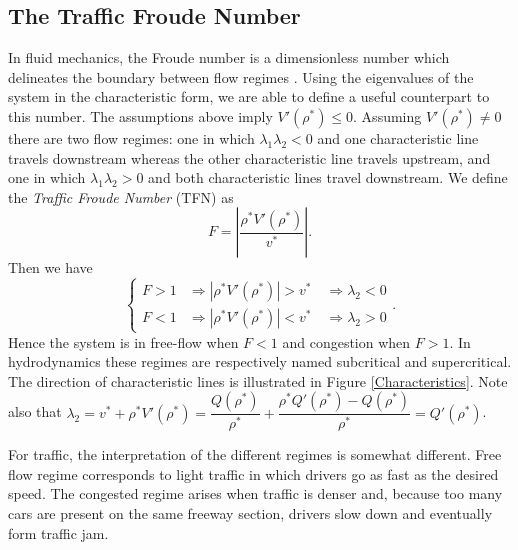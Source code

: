 \documentclass[a4paper, 10pt, conference]{ieeeconf}      %
\begin{document}
\subsection{The Traffic Froude Number}
In fluid mechanics, the Froude number is a dimensionless number which delineates the boundary between flow regimes \cite{litrico2009modeling, Sturm}. Using the eigenvalues of the system in the characteristic form, we are able to define a useful counterpart to this number. 
The assumptions above imply $V'(\rho^*) \leq 0$. Assuming $V'(\rho^*) \neq 0$ there are two flow regimes: one in which $\lambda_1 \lambda_2 < 0$ and one characteristic line travels downstream whereas the other characteristic line travels upstream, and one in which $\lambda_1 \lambda_2 > 0$ and both characteristic lines travel downstream. We define the \textit{Traffic Froude Number} (TFN) as
\begin{equation}
F = \left\lvert\dfrac{\rho^*V'( \rho^*)}{v^*}\right\rvert.
\end{equation}
Then we have
{\footnotesize
\begin{equation*}
\begin{cases}
F > 1 &\Rightarrow |\rho^*V'(\rho^*)| > v^* \quad \Rightarrow \lambda_2  <0 \\
F < 1 &\Rightarrow |\rho^*V'(\rho^*)| < v^* \quad \Rightarrow \lambda_2 > 0
\end{cases}.
\end{equation*}
}
Hence the system is in free-flow when $F<1$ and congestion when $F>1$. In hydrodynamics these regimes are respectively named subcritical and supercritical\cite{litrico2009modeling}. The direction of characteristic lines is illustrated in Figure \ref{Characteristics}. Note also that {\footnotesize$\lambda_2 = v^* + \rho^* V'( \rho^*) = \dfrac{Q(\rho^*)}{\rho^*} + \dfrac{\rho^*Q'(\rho^*)-Q(\rho^*)}{\rho^*} = Q'(\rho^*)$}.

For traffic, the interpretation of the different regimes is somewhat different. Free flow regime corresponds to light traffic in which drivers go as fast as the desired speed. The congested regime arises when traffic is denser and, because too many cars are present on the same freeway section, drivers slow down and eventually form traffic jam.
\end{document}
